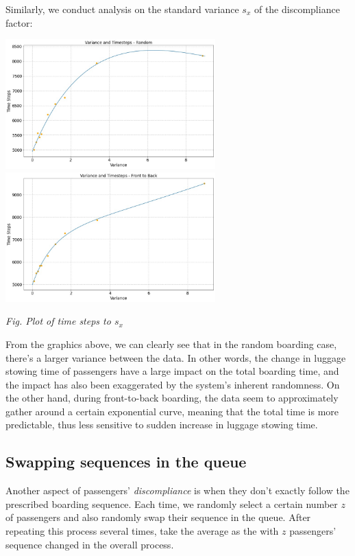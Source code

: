 \documentclass{article}
\theoremstyle{definition}
\theoremstyle{remark}
\numberwithin{equation}{section}
\begin{document}
	Similarly, we conduct analysis on the standard variance \(s_x\) of the discompliance factor:

	\begin{center}
		\includegraphics[height = 5cm]{variance and timesteps random fitted.jpg}
		\includegraphics[height = 5cm]{variance and timesteps ftb fitted.jpg}

		\small\textit{Fig. Plot of time steps to \(s_x\)}
	\end{center}

	From the graphics above, we can clearly see that in the random boarding case, there's a larger variance between the data. In other words, the change in luggage stowing time of passengers have a large impact on the total boarding time, and the impact has also been exaggerated by the system's inherent randomness. On the other hand, during front-to-back boarding, the data seem to approximately gather around a certain exponential curve, meaning that the total time is more predictable, thus less sensitive to sudden increase in luggage stowing time.

	\subsection{Swapping sequences in the queue}
	Another aspect of passengers' \textit{discompliance} is when they don't exactly follow the prescribed boarding sequence. Each time, we randomly select a certain number \(z\) of passengers and also randomly swap their sequence in the queue. After repeating this process several times, take the average as the  with \(z\) passengers' sequence changed in the overall process.
\end{document}

